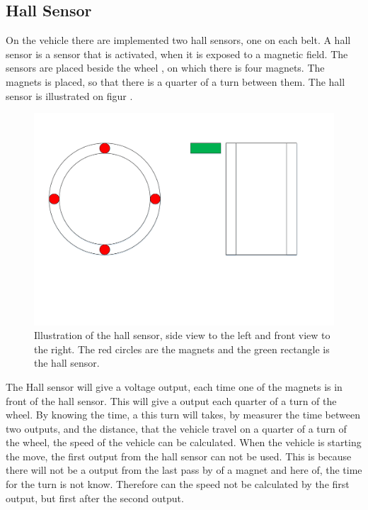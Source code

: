 \subsection{Hall Sensor}

On the vehicle there are implemented two hall sensors, one on each belt. A hall sensor is a sensor that is activated, when it is exposed to a magnetic field. The sensors are placed beside the wheel , on which there is four magnets. The magnets is placed, so that there is a quarter of a turn between them. The hall sensor is illustrated on figur .

 \begin{figure}[H]
	\centering
	\includegraphics[scale=0.5]{figures/HallSensorSide_Forward_view.pdf}
	\caption{Illustration of the hall sensor, side view to the left and front view to the right. The red circles are the magnets and the green rectangle is the hall sensor.}
	\label{fig:HallSensor}
\end{figure}

The Hall sensor will give a voltage output, each time one of the magnets is in front of the hall sensor. This will give a output each quarter of a turn of the wheel. By knowing the time, a this turn will takes, by measurer the time between two outputs, and the distance, that the vehicle travel on a quarter of a turn of the wheel, the speed of the vehicle can be calculated.
When the vehicle is starting the move, the first output from the hall sensor can not be used. This is because there will not be a output from the last pass by of a magnet and here of, the time for the turn is not know. Therefore can the speed not be calculated by the first output, but first after the second output.